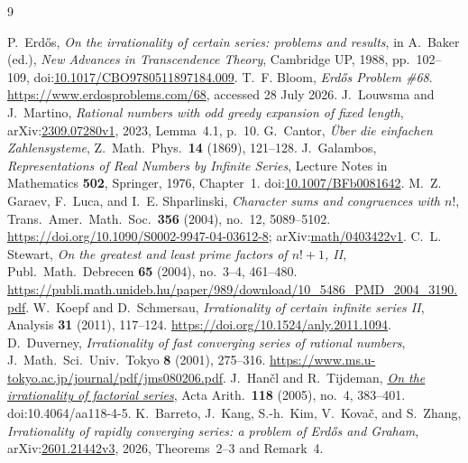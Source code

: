 \begin{thebibliography}{9}
\small
\raggedright
\setlength{\itemsep}{0pt}
 P.~Erd\H{o}s, \emph{On the irrationality of certain series:
  problems and results}, in A.~Baker (ed.), \emph{New Advances in Transcendence
  Theory}, Cambridge UP, 1988, pp.~102--109,
  doi:\href{https://doi.org/10.1017/CBO9780511897184.009}
  {10.1017/CBO9780511897184.009}.
 T.~F. Bloom, \emph{Erd\H{o}s Problem \#68}.
  \url{https://www.erdosproblems.com/68}, accessed 28 July 2026.
  J.~Louwsma and J.~Martino,
  \emph{Rational numbers with odd greedy expansion of fixed length},
  arXiv:\href{https://arxiv.org/abs/2309.07280v1}{2309.07280v1}, 2023,
  Lemma~4.1, p.~10.
  G.~Cantor,
  \emph{\"Uber die einfachen Zahlensysteme},
  Z.\ Math.\ Phys.\ \textbf{14} (1869), 121--128.
  J.~Galambos,
  \emph{Representations of Real Numbers by Infinite Series},
  Lecture Notes in Mathematics \textbf{502}, Springer, 1976, Chapter~1.
  doi:\href{https://doi.org/10.1007/BFb0081642}{10.1007/BFb0081642}.
  M.~Z. Garaev, F.~Luca, and I.~E. Shparlinski,
  \emph{Character sums and congruences with $n!$},
  Trans.\ Amer.\ Math.\ Soc.\ \textbf{356} (2004), no.~12, 5089--5102.
  \url{https://doi.org/10.1090/S0002-9947-04-03612-8};
  arXiv:\href{https://arxiv.org/abs/math/0403422}{math/0403422v1}.
  C.~L. Stewart,
  \emph{On the greatest and least prime factors of $n!+1$, II},
  Publ.\ Math.\ Debrecen \textbf{65} (2004), no.~3--4, 461--480.
  \url{https://publi.math.unideb.hu/paper/989/download/10_5486_PMD_2004_3190.pdf}.
  W.~Koepf and D.~Schmersau,
  \emph{Irrationality of certain infinite series II},
  Analysis \textbf{31} (2011), 117--124.
  \url{https://doi.org/10.1524/anly.2011.1094}.
  D.~Duverney,
  \emph{Irrationality of fast converging series of rational numbers},
  J.\ Math.\ Sci.\ Univ.\ Tokyo \textbf{8} (2001), 275--316.
  \url{https://www.ms.u-tokyo.ac.jp/journal/pdf/jms080206.pdf}.
  J.~Han\v{c}l and R.~Tijdeman,
  \href{https://geodesic.mathdoc.fr/articles/10.4064/aa118-4-5/}
  {\emph{On the irrationality of factorial series}},
  Acta Arith.\ \textbf{118} (2005), no.~4, 383--401.
  doi:10.4064/aa118-4-5.
  K.~Barreto, J.~Kang, S.-h.~Kim, V.~Kova\v{c}, and S.~Zhang,
  \emph{Irrationality of rapidly converging series: a problem of Erd\H{o}s
  and Graham},
  arXiv:\href{https://arxiv.org/abs/2601.21442v3}{2601.21442v3}, 2026,
  Theorems~2--3 and Remark~4.
\end{thebibliography}


